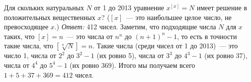 \problem
Для скольких натуральных $N$ от 1 до 2013 уравнение $x^{[x]} = N$ имеет
решение в положительных вещественных $x$?
($[x]$~--- это наибольшее целое число, не превосходящее $x$.)
\solution
\emph{Ответ:} 412 чисел.
Заметим, что подходящие числа $N$ для $x$ таких, что $[x] = n$~--- это числа от
$n^n$ до $(n+1)^n - 1$, то есть в точности такие числа, что
$[\sqrt[n]{N}] = n$.
Такие числа (среди чисел от 1 до 2013)~--- это
число 1,
числа от $2^2$ до $3^2 - 1$ (их ровно 5),
числа от $3^3$ до $4^3 - 1$ (их ровно 37),
числа от $4^4$ до $5^4 - 1$ (их ровно 369).
Итого мы получаем всего $1 + 5 + 37 + 369 = 412$ чисел.
\endproblem
